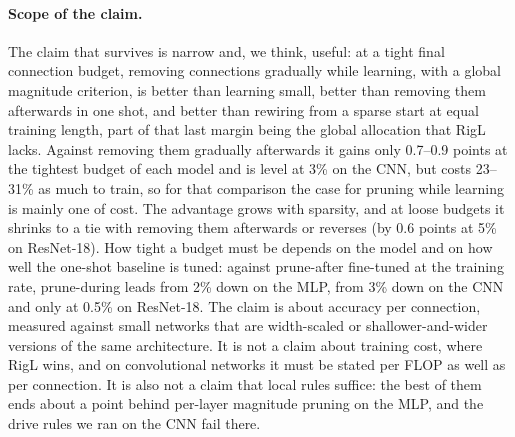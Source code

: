 \documentclass[11pt]{article}
\begin{document}
\paragraph{Scope of the claim.} The claim that survives is narrow and, we think, useful: at a tight final connection budget,
removing connections gradually while learning, with a global magnitude criterion, is better than learning small, better
than removing them afterwards in one shot, and better than rewiring from a sparse start at equal training length, part of
that last margin being the global allocation that RigL lacks. Against removing them gradually afterwards it gains only
0.7--0.9 points at the tightest budget of each model and is level at 3\% on the CNN, but costs 23--31\% as much to train, so for that
comparison the case for pruning while learning is mainly one of cost. The advantage grows with sparsity, and at loose
budgets it shrinks to a tie with removing them afterwards or reverses (by 0.6 points at 5\% on ResNet-18). How tight
a budget must be depends on the model and on how well the one-shot baseline is tuned: against prune-after fine-tuned at
the training rate, prune-during leads from 2\% down on the MLP, from 3\% down on the CNN and only at 0.5\% on ResNet-18. The claim is about accuracy per connection, measured against small networks that are width-scaled or shallower-and-wider
versions of the same architecture. It is not a claim about training cost, where RigL wins, and on
convolutional networks it must be stated per FLOP as well as per connection. It is also not a claim that local rules suffice:
the best of them ends about a point behind per-layer magnitude pruning on the MLP, and the drive rules we ran on the CNN
fail there.
\end{document}
